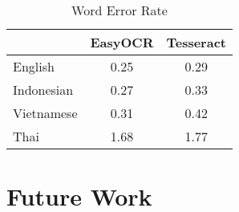 \documentclass[12pt,oneside]{memoir}
\begin{document}
\begin{table}[h]
    \centering
    \begin{tabular}{|l|c|c|}
        \hline
        & EasyOCR & Tesseract \\
        \hline
        English & 0.25 & 0.29\\
        Indonesian & 0.27& 0.33\\
        Vietnamese & 0.31& 0.42\\
        Thai & 1.68 & 1.77\\
        \hline
    \end{tabular}
    \caption{Word Error Rate}
\end{table}

\chapter{Future Work}

\printbibliography[title={References}]
\end{document}
